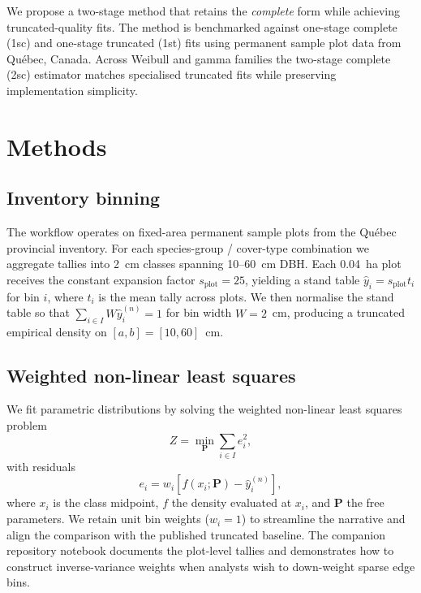 \documentclass[12pt]{article}
\begin{document}
We propose a two-stage method that retains the \emph{complete} form while achieving truncated-quality fits. The method is benchmarked against one-stage complete (1sc) and one-stage truncated (1st) fits using permanent sample plot data from Qu\'ebec, Canada. Across Weibull and gamma families the two-stage complete (2sc) estimator matches specialised truncated fits while preserving implementation simplicity.

\section{Methods}
\label{sec:methods}

\subsection{Inventory binning}
\label{sec:methods_binning}

The workflow operates on fixed-area permanent sample plots from the Qu\'ebec provincial inventory. For each species-group / cover-type combination we aggregate tallies into 2~cm classes spanning 10--60~cm DBH. Each 0.04~ha plot receives the constant expansion factor $s_{\text{plot}} = 25$, yielding a stand table $\hat{y}_i = s_{\text{plot}} t_i$ for bin $i$, where $t_i$ is the mean tally across plots. We then normalise the stand table so that $\sum_{i \in I} W \hat{y}_i^{(n)} = 1$ for bin width $W = 2$~cm, producing a truncated empirical density on $[a, b] = [10, 60]$~cm.

\subsection{Weighted non-linear least squares}
\label{sec:methods_nlls}

We fit parametric distributions by solving the weighted non-linear least squares problem
\begin{equation}
  Z = \min_{\bm{P}} \sum_{i \in I} e_i^2,
\end{equation}
with residuals
\begin{equation}
  e_i = w_i \left[f(x_i; \bm{P}) - \hat{y}_i^{(n)}\right],
\end{equation}
where $x_i$ is the class midpoint, $f$ the density evaluated at $x_i$, and $\bm{P}$ the free parameters. We retain unit bin weights ($w_i = 1$) to streamline the narrative and align the comparison with the published truncated baseline. The companion repository notebook documents the plot-level tallies and demonstrates how to construct inverse-variance weights when analysts wish to down-weight sparse edge bins.
\end{document}

